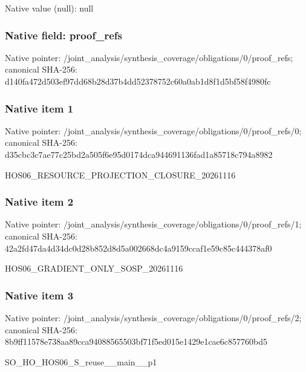 \documentclass[10pt,a4paper]{article}
\begin{document}
Native value (null): null

\subsubsection{Native field: proof\_\allowbreak{}refs}
Native pointer: /joint\_\allowbreak{}analysis/synthesis\_\allowbreak{}coverage/obligations/0/proof\_\allowbreak{}refs; canonical SHA-256: d140fa472d503ef97dd68b28d37b4dd52378752c60a0ab1d8f1d5bf58f4980fc

\subsubsection{Native item 1}
Native pointer: /joint\_\allowbreak{}analysis/synthesis\_\allowbreak{}coverage/obligations/0/proof\_\allowbreak{}refs/0; canonical SHA-256: d35cbc3c7ae77c25bd2a505f6e95d0174dca944691136fad1a85718c794a8982

\begingroup\raggedright\sloppy HOS06\_\allowbreak{}RESOURCE\_\allowbreak{}PROJECTION\_\allowbreak{}CLOSURE\_\allowbreak{}20261116\par\endgroup

\subsubsection{Native item 2}
Native pointer: /joint\_\allowbreak{}analysis/synthesis\_\allowbreak{}coverage/obligations/0/proof\_\allowbreak{}refs/1; canonical SHA-256: 42a2fd47da4d34dc0d28b852d8d5a002668dc4a9159ccaf1e59c85c444378af0

\begingroup\raggedright\sloppy HOS06\_\allowbreak{}GRADIENT\_\allowbreak{}ONLY\_\allowbreak{}SOSP\_\allowbreak{}20261116\par\endgroup

\subsubsection{Native item 3}
Native pointer: /joint\_\allowbreak{}analysis/synthesis\_\allowbreak{}coverage/obligations/0/proof\_\allowbreak{}refs/2; canonical SHA-256: 8b9ff11578e738aa89cca94088565503bf71f5ed015e1429e1cae6c857760bd5

\begingroup\raggedright\sloppy SO\_\allowbreak{}HO\_\allowbreak{}HOS06\_\allowbreak{}S\_\allowbreak{}reuse\_\allowbreak{}\_\allowbreak{}main\_\allowbreak{}\_\allowbreak{}p1\par\endgroup
\end{document}
